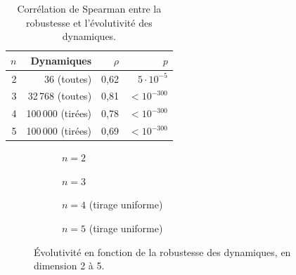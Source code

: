\documentclass[12pt, a4paper]{article}
\begin{document}
\begin{table}[H]
\centering
\small
\caption{Corrélation de Spearman entre la robustesse et l'évolutivité des dynamiques.}
\label{tab:spearman}
\begin{tabular}{rrrr}
\toprule
$n$ & Dynamiques & $\rho$ & $p$ \\
\midrule
2 & 36 (toutes) & 0,62 & $5 \cdot 10^{-5}$ \\
3 & 32\,768 (toutes) & 0,81 & $< 10^{-300}$ \\
4 & 100\,000 (tirées) & 0,78 & $< 10^{-300}$ \\
5 & 100\,000 (tirées) & 0,69 & $< 10^{-300}$ \\
\bottomrule
\end{tabular}
\end{table}

\begin{figure}[H]
    \centering
    \begin{subfigure}{0.48\linewidth}
        \centering
        \caption{$n = 2$}
    \end{subfigure}
    \hfill
    \begin{subfigure}{0.48\linewidth}
        \centering
        \caption{$n = 3$}
    \end{subfigure}

    \medskip
    \begin{subfigure}{0.48\linewidth}
        \centering
        \caption{$n = 4$ (tirage uniforme)}
    \end{subfigure}
    \hfill
    \begin{subfigure}{0.48\linewidth}
        \centering
        \caption{$n = 5$ (tirage uniforme)}
    \end{subfigure}
    \caption{Évolutivité en fonction de la robustesse des dynamiques, en dimension 2 à 5.}
    \label{fig:robustesse-evolutivite}
\end{figure}
\end{document}
